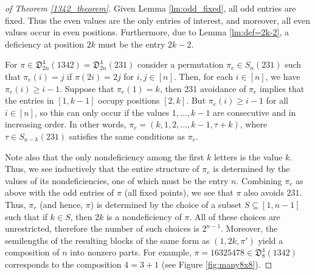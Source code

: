 \documentclass[
final
]{dmtcs-episciences}
\theoremstyle{definition}
\theoremstyle{remark}
\begin{document}
\begin{proof}[of Theorem \ref{1342_theorem}]
Given Lemma \ref{lm:odd_fixed}, all odd entries are fixed. Thus the even values are the only entries of interest, and moreover, all even values occur in even positions.  Furthermore, due to Lemma \ref{lm:def=2k-2}, a deficiency at position $2k$ must be the entry $2k-2$.

For $\pi\in\mathfrak{D}^4_{2n}(1342)=\mathfrak{D}^4_{2n}(231)$ consider a permutation $\pi_e\in S_n(231)$ such that $\pi_e(i)=j$ if $\pi(2i)=2j$ for $i,j\in[n]$. Then, for each $i\in[n]$, we have $\pi_e(i)\ge i-1$. Suppose that $\pi_e(1)=k$, then 231 avoidance of $\pi_e$ implies that the entries in $[1,k-1]$ occupy positions $[2,k]$. But $\pi_e(i)\ge i-1$ for all $i\in[n]$, so this can only occur if the values $1,\dots,k-1$ are consecutive and in increasing order. In other words, $\pi_e=(k,1,2,\dots,k-1,\tau+k)$, where $\tau\in S_{n-k}(231)$ satisfies the same conditions as $\pi_e$. 

Note also that the only nondeficiency among the first $k$ letters is the value $k$. Thus, we see inductively that the entire structure of $\pi_e$ is determined by the values of its nondeficiencies, one of which must be the entry $n$. Combining $\pi_e$ as above with the odd entries of $\pi$ (all fixed points), we see that $\pi$ also avoids $231$. Thus, $\pi_e$ (and hence, $\pi$) is determined by the choice of a subset $S \subseteq [1,n-1]$ such that if $k\in S$, then $2k$ is a nondeficiency of $\pi$. All of these choices are unrestricted, therefore the number of such choices is $2^{n-1}$. Moreover, the semilengths of the resulting blocks of the same form as $(1,2k,\pi')$ yield a composition of $n$ into nonzero parts. For example, $\pi = 16325478 \in \mathfrak{D}^4_{8}(1342)$ corresponds to the composition $4=3+1$ (see Figure \ref{fig:many8x8}). \qedhere



\end{proof}
\end{document}

